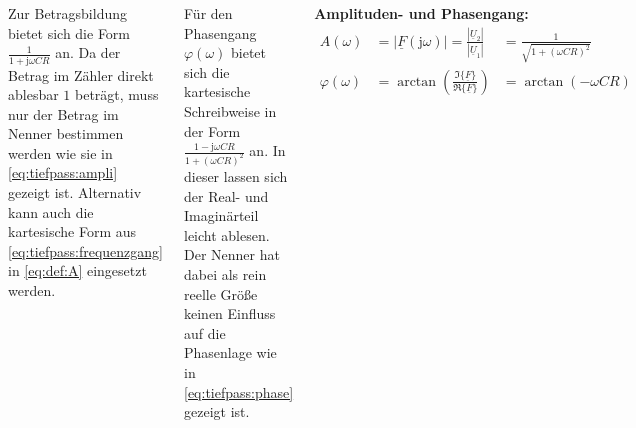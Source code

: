 \begin{frame}[t]
\begin{columns}[T]
{        Zur Betragsbildung bietet sich die Form $\frac{1}{1+\mathrm{j}\omega CR}$ an.
        Da der Betrag im Zähler direkt ablesbar $1$ beträgt, muss nur der Betrag im Nenner 
        bestimmen werden wie sie in \eqref{eq:tiefpass:ampli} gezeigt ist.
        Alternativ kann auch die kartesische Form aus \eqref{eq:tiefpass:frequenzgang} in 
        \eqref{eq:def:A} eingesetzt werden. 

        Für den Phasengang $\varphi(\omega)$ bietet sich die kartesische Schreibweise in 
        der Form $\frac{1-\mathrm{j}\omega CR}{1+(\omega CR)^2}$ an.
        In dieser lassen sich der Real- und Imaginärteil leicht ablesen. 
        Der Nenner hat dabei als rein reelle Größe keinen Einfluss auf die Phasenlage 
        wie in \eqref{eq:tiefpass:phase} gezeigt ist.
    }%
    
    \b{\textbf{Amplituden- und Phasengang:}
        \begin{align}
            A(\omega)       &= |\underline{F}(\mathrm{j}\omega)| = \frac{|\underline{U}_2|}{|\underline{U}_1|}
                            &= \frac{1}{\sqrt{1 + (\omega CR)^2}} \\%
            \varphi(\omega) &= \arctan\left(\frac{\Im\{\underline{F}\}}{\Re\{\underline{F}\}}\right)
                            &= \arctan\left(-\omega CR\right)        
        \end{align}
    }
\end{columns}
\end{frame}
